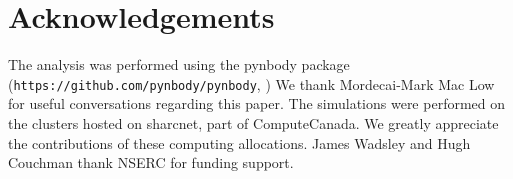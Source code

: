 \section*{Acknowledgements}
The analysis was performed using the pynbody package
(\texttt{https://github.com/pynbody/pynbody}, \citep{pynbody})
  We thank Mordecai-Mark Mac Low for useful
conversations regarding this paper.  The simulations were performed on the
clusters hosted on {\sc sharcnet}, part of ComputeCanada.  We greatly
appreciate the contributions of these computing allocations. James Wadsley and
Hugh Couchman thank NSERC for funding support.


